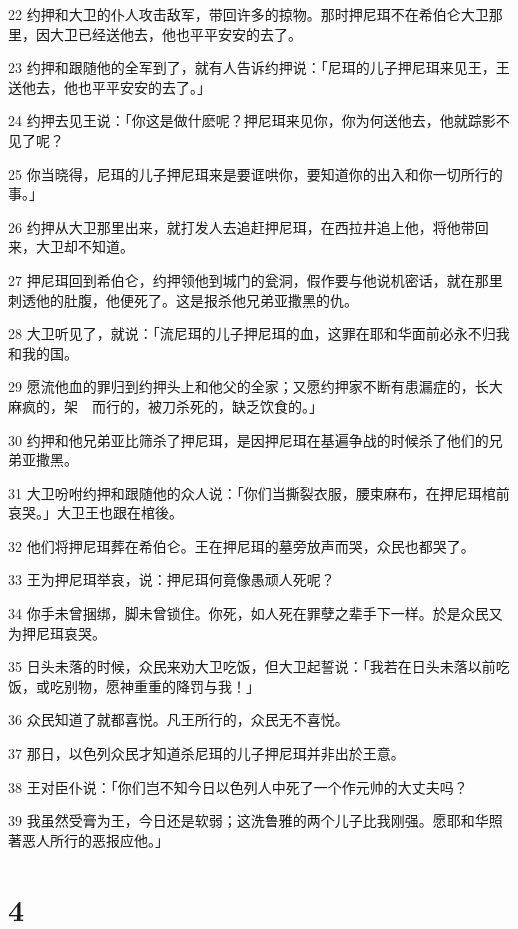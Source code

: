 \par 22 约押和大卫的仆人攻击敌军，带回许多的掠物。那时押尼珥不在希伯仑大卫那里，因大卫已经送他去，他也平平安安的去了。
\par 23 约押和跟随他的全军到了，就有人告诉约押说：「尼珥的儿子押尼珥来见王，王送他去，他也平平安安的去了。」
\par 24 约押去见王说：「你这是做什麽呢？押尼珥来见你，你为何送他去，他就踪影不见了呢？
\par 25 你当晓得，尼珥的儿子押尼珥来是要诓哄你，要知道你的出入和你一切所行的事。」
\par 26 约押从大卫那里出来，就打发人去追赶押尼珥，在西拉井追上他，将他带回来，大卫却不知道。
\par 27 押尼珥回到希伯仑，约押领他到城门的瓮洞，假作要与他说机密话，就在那里刺透他的肚腹，他便死了。这是报杀他兄弟亚撒黑的仇。
\par 28 大卫听见了，就说：「流尼珥的儿子押尼珥的血，这罪在耶和华面前必永不归我和我的国。
\par 29 愿流他血的罪归到约押头上和他父的全家；又愿约押家不断有患漏症的，长大麻疯的，架　而行的，被刀杀死的，缺乏饮食的。」
\par 30 约押和他兄弟亚比筛杀了押尼珥，是因押尼珥在基遍争战的时候杀了他们的兄弟亚撒黑。
\par 31 大卫吩咐约押和跟随他的众人说：「你们当撕裂衣服，腰束麻布，在押尼珥棺前哀哭。」大卫王也跟在棺後。
\par 32 他们将押尼珥葬在希伯仑。王在押尼珥的墓旁放声而哭，众民也都哭了。
\par 33 王为押尼珥举哀，说：押尼珥何竟像愚顽人死呢？
\par 34 你手未曾捆绑，脚未曾锁住。你死，如人死在罪孽之辈手下一样。於是众民又为押尼珥哀哭。
\par 35 日头未落的时候，众民来劝大卫吃饭，但大卫起誓说：「我若在日头未落以前吃饭，或吃别物，愿神重重的降罚与我！」
\par 36 众民知道了就都喜悦。凡王所行的，众民无不喜悦。
\par 37 那日，以色列众民才知道杀尼珥的儿子押尼珥并非出於王意。
\par 38 王对臣仆说：「你们岂不知今日以色列人中死了一个作元帅的大丈夫吗？
\par 39 我虽然受膏为王，今日还是软弱；这洗鲁雅的两个儿子比我刚强。愿耶和华照著恶人所行的恶报应他。」

\chapter{4}

